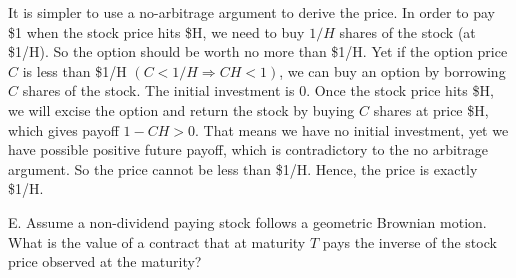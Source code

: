 \begin{solution}
It is simpler to use a no-arbitrage argument to derive the price. In order to pay \$1 when
the stock price hits \$H, we need to buy $1/H$ shares of the stock (at \$1/H). So the option
should be worth no more than \$1/H. Yet if the option price $C$ is less than \$1/H
$(C<1/H\Rightarrow CH<1)$, we can buy an option by borrowing $C$ shares of the stock.
The initial investment is 0. Once the stock price hits \$H, we will excise the option and
return the stock by buying $C$ shares at price \$H, which gives payoff $1-CH>0$. That
means we have no initial investment, yet we have possible positive future payoff, which is
contradictory to the no arbitrage argument. So the price cannot be less than \$1/H. Hence,
the price is exactly \$1/H.

\end{solution}

\begin{problem}{E. Assume a non-dividend paying stock follows a geometric Brownian motion. What is the value of a contract that at maturity $T$ pays the inverse of the stock price observed at the maturity?}
\end{problem}




